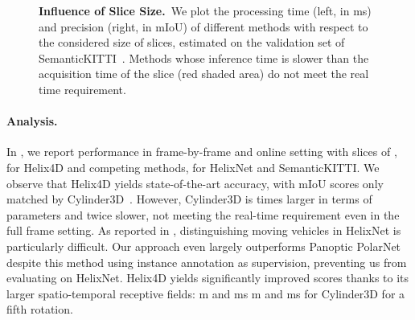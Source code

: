 \documentclass[runningheads]{tpls/llncs}
\begin{document}
\begin{figure}[t]
 	\caption{{\bf Influence of Slice Size.}~{We plot the processing time (left, in ms) and precision (right, in mIoU) of different methods with respect to the considered size of slices, estimated on the validation set of SemanticKITTI~\cite{behley2019iccv}. 
	Methods whose inference time is slower than the acquisition time of the slice (red shaded area) do not meet the real time requirement.
	}}
    \label{fig:main}
\end{figure}

\paragraph{Analysis.}
In , we report performance in frame-by-frame and online setting with slices of , for Helix4D and competing methods, for HelixNet and SemanticKITTI. 
We observe that Helix4D yields state-of-the-art accuracy, with mIoU scores only matched by Cylinder3D~\cite{zhu2021cylindrical}. However, Cylinder3D is  times larger in terms of parameters and twice slower, not meeting the real-time requirement even in the full frame setting. As reported in , 
distinguishing moving vehicles in HelixNet is particularly difficult. Our approach even largely outperforms Panoptic PolarNet despite this method using instance annotation as supervision, preventing us from evaluating on HelixNet. Helix4D yields significantly improved scores thanks to its larger spatio-temporal receptive fields: m and ms \vs m and ms for Cylinder3D for a fifth rotation.
\end{document}
